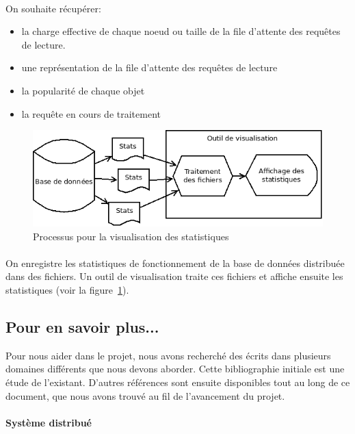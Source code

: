 \documentclass[12pt]{article}
\begin{document}
\paragraph{} On souhaite récupérer:
\begin{itemize}
 \item la charge effective de chaque noeud ou taille de la file d'attente des requêtes de lecture.
 \item une représentation de la file d'attente des requêtes de lecture
 \item la popularité de chaque objet
 \item la requête en cours de traitement
\end{itemize}

\begin{figure}[h]
	\centering
		\includegraphics[width=12cm]{images/besoins/visu.png}
	\caption{Processus pour la visualisation des statistiques \label{fig:visu}}
\end{figure}

\paragraph{} On enregistre les statistiques de fonctionnement de la base de données distribuée dans des fichiers. Un outil de visualisation traite ces fichiers et affiche ensuite les statistiques (voir la figure~\ref{fig:visu}).

\newpage
\subsection{Pour en savoir plus...}
Pour nous aider dans le projet, nous avons recherché des écrits dans plusieurs domaines différents que nous devons aborder. Cette bibliographie initiale est une étude de l'existant. D'autres références sont ensuite disponibles tout au long de ce document, que nous avons trouvé au fil de l'avancement du projet.

\paragraph{Système distribué}
\end{document}
